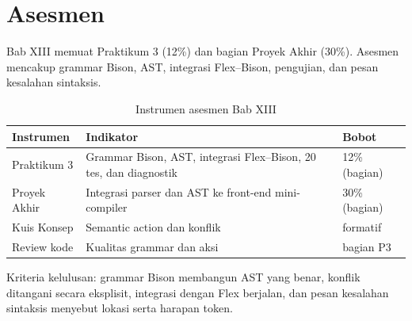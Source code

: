 \section*{Asesmen}

Bab XIII memuat Praktikum 3 (12\%) dan bagian Proyek Akhir (30\%).
Asesmen mencakup grammar Bison, AST, integrasi Flex--Bison, pengujian,
dan pesan kesalahan sintaksis.

\begin{table}[H]
\centering
\caption{Instrumen asesmen Bab XIII}
\label{tab:ch13-asesmen}
\begin{tabularx}{\textwidth}{@{}lXl@{}}
\toprule
\textbf{Instrumen} & \textbf{Indikator} & \textbf{Bobot} \\
\midrule
Praktikum 3 & Grammar Bison, AST, integrasi Flex--Bison, 20 tes, dan
diagnostik & 12\% (bagian) \\
Proyek Akhir & Integrasi parser dan AST ke front-end mini-compiler &
30\% (bagian) \\
Kuis Konsep & Semantic action dan konflik & formatif \\
Review kode & Kualitas grammar dan aksi & bagian P3 \\
\bottomrule
\end{tabularx}
\end{table}

Kriteria kelulusan: grammar Bison membangun AST yang benar, konflik
ditangani secara eksplisit, integrasi dengan Flex berjalan, dan pesan
kesalahan sintaksis menyebut lokasi serta harapan token.
